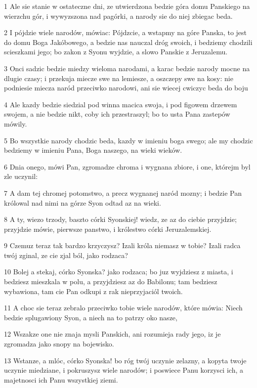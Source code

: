 \par 1 Ale sie stanie w ostateczne dni, ze utwierdzona bedzie góra domu Panskiego na wierzchu gór, i wywyzszona nad pagórki, a narody sie do niej zbiegac beda.
\par 2 I pójdzie wiele narodów, mówiac: Pójdzcie, a wstapmy na góre Panska, to jest do domu Boga Jakóbowego, a bedzie nas nauczal dróg swoich, i bedziemy chodzili scieszkami jego; bo zakon z Syonu wyjdzie, a slowo Panskie z Jeruzalemu.
\par 3 Onci sadzic bedzie miedzy wieloma narodami, a karac bedzie narody mocne na dlugie czasy; i przekuja miecze swe na lemiesze, a oszczepy swe na kosy: nie podniesie miecza naród przeciwko narodowi, ani sie wiecej cwiczyc beda do boju
\par 4 Ale kazdy bedzie siedzial pod winna macica swoja, i pod figowem drzewem swojem, a nie bedzie nikt, coby ich przestraszyl; bo to usta Pana zastepów mówily.
\par 5 Bo wszystkie narody chodzic beda, kazdy w imieniu boga swego; ale my chodzic bedziemy w imieniu Pana, Boga naszego, na wieki wieków.
\par 6 Dnia onego, mówi Pan, zgromadze chroma i wygnana zbiore, i one, którejm byl zle uczynil:
\par 7 A dam tej chromej potomstwo, a precz wygnanej naród mozny; i bedzie Pan królowal nad nimi na górze Syon odtad az na wieki.
\par 8 A ty, wiezo trzody, baszto córki Syonskiej! wiedz, ze az do ciebie przyjdzie; przyjdzie mówie, pierwsze panstwo, i królestwo córki Jeruzalemskiej.
\par 9 Czemuz teraz tak bardzo krzyczysz? Izali króla niemasz w tobie? Izali radca twój zginal, ze cie zjal ból, jako rodzaca?
\par 10 Bolej a stekaj, córko Syonska? jako rodzaca; bo juz wyjdziesz z miasta, i bedziesz mieszkala w polu, a przyjdziesz az do Babilonu; tam bedziesz wybawiona, tam cie Pan odkupi z rak nieprzyjaciól twoich.
\par 11 A choc sie teraz zebralo przeciwko tobie wiele narodów, które mówia: Niech bedzie splugawiony Syon, a niech na to patrzy oko nasze,
\par 12 Wszakze one nie znaja mysli Panskich, ani rozumieja rady jego, iz je zgromadza jako snopy na bojewisko.
\par 13 Wstanze, a mlóc, córko Syonska! bo róg twój uczynie zelazny, a kopyta twoje uczynie miedziane, i pokruszysz wiele narodów; i poswiece Panu korzysci ich, a majetnosci ich Panu wszystkiej ziemi.

